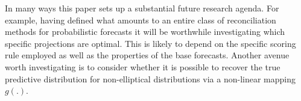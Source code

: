 \documentclass[a4paper, 11pt]{article}
\theoremstyle{definition}
\begin{document}
In many ways this paper sets up a substantial future research agenda. For example, having defined what amounts to an entire class of reconciliation methods for probabilistic forecasts it will be worthwhile investigating which specific projections are optimal. This is likely to depend on the specific scoring rule employed as well as the properties of the base forecasts. Another avenue worth investigating is to consider whether it is possible to recover the true predictive distribution for non-elliptical distributions via a non-linear mapping $g(.)$.




\newpage
\printbibliography
\end{document}

